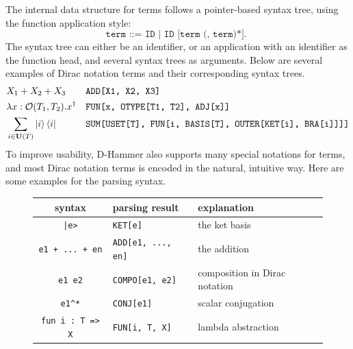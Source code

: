 The internal data structure for terms follows a pointer-based syntax tree, using the function application style:
\[
    \texttt{
        term ::= ID | ID [term (, term)*].
    }
\]
The syntax tree can either be an identifier, or an application with an identifier as the function head, and several syntax trees as arguments. Below are several examples of Dirac notation terms and their corresponding syntax trees.
\footnotesize{
\begin{align*}
    & X_1 + X_2 + X_3 && \texttt{ADD[X1, X2, X3]} 
    \\
    & \lambda x: \mathcal{O}(T_1,  T_2). x^\dagger && \texttt{FUN[x, OTYPE[T1, T2], ADJ[x]]}
    \\
    & \sum_{i \in \mathbf{U}(T)} \ket{i} \bra{i} && \texttt{SUM[USET[T], FUN[i, BASIS[T], OUTER[KET[i], BRA[i]]]]}
\end{align*}
}
To improve usability, D-Hammer also supports many special notations for terms, and most Dirac notation terms is encoded in the natural, intuitive way.
Here are some examples for the parsing syntax.

\begin{figure}
    \center
\begin{tabular}{c >{\centering\arraybackslash}p{4cm} l}
    \hline
    syntax & parsing result & explanation \\
    \hline
    \texttt{|e>} & \texttt{KET[e]} & the ket basis\\
    \texttt{e1 + ... + en} & \texttt{ADD[e1, ..., en]} & the addition\\
    \texttt{e1\ e2} & \texttt{COMPO[e1, e2]} & composition in Dirac notation \\
    \texttt{e1\^{}*} & \texttt{CONJ[e1]} & scalar conjugation \\
    \texttt{fun i : T => X} & \texttt{FUN[i, T, X]} & lambda abstraction \\
    \hline
\end{tabular}
\end{figure}

